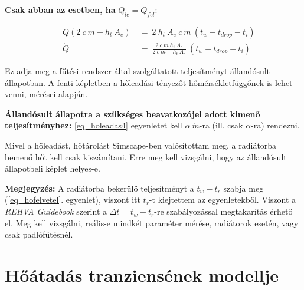 \textbf{Csak abban az esetben, ha} $\dot Q_{le}=\dot Q_{fel}$:



\begin{equation} \label{eq_holeadas4}
\begin{aligned}
~~~~~~\dot Q (2 ~ c ~ \dot{m} + h_t ~ A_e) & ~=~ 2 ~ h_t ~ A_e ~ c~ \dot{m} ~(t_w-t_{drop}-t_i) \\[18pt]
~~~~~~\dot Q &~=~ \frac{2~c~\dot{m}~h_t~A_e}{2 ~c ~ \dot{m} + h_t ~ A_e}~(t_w-t_{drop}-t_i)
\end{aligned}
\end{equation}

Ez adja meg a fűtési rendszer által szolgáltatott teljesítményt állandósult állapotban.
A fenti képletben a hőleadási tényezőt hőmérsékletfüggőnek is lehet venni, \cite{CHOLEWA2013599} mérései alapján.

\textbf{Állandósult állapotra a szükséges beavatkozójel adott kimenő teljesítményhez:} \ref{eq_holeadas4} egyenletet kell $\alpha~\dot{m}$-ra (ill. csak $\alpha$-ra) rendezni.

Mivel a hőleadást, hőtárolást Simscape-ben valósítottam meg, a radiátorba bemenő hőt kell csak kiszámítani. Erre meg kell vizsgálni, hogy az állandósult állapotbeli képlet helyes-e.

\begin{formal}
	\textbf{Megjegyzés:} A radiátorba bekerülő teljesítményt a $t_w-t_r$ szabja meg (\ref{eq_hofelvetel}. egyenlet), viszont itt $t_r$-t kiejtettem az egyenletekből. Viszont a \textit{REHVA Guidebook}
	\cite{RehvaGuidebookNo7} szerint a $\Delta t= t_w-t_r$-re szabályozással megtakarítás érhető el. Meg kell vizsgálni, reális-e mindkét paraméter mérése, radiátorok esetén, vagy csak padlófűtésnél.
\end{formal}

%




\section{Hőátadás tranziensének modellje}\label{section:dinamikus}








